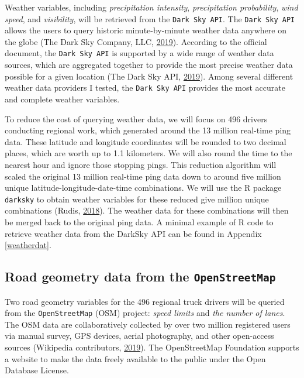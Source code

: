 \documentclass[12pt]{book}
\numberwithin{equation}{chapter}
\begin{document}
Weather variables, including \emph{precipitation intensity}, \emph{precipitation probability}, \emph{wind speed}, and \emph{visibility}, will be retrieved from the \texttt{Dark\ Sky\ API}.
The \texttt{Dark\ Sky\ API} allows the users to query historic minute-by-minute weather data anywhere on the globe (The Dark Sky Company, LLC, \protect\hyperlink{ref-darksky}{2019}).
According to the official document, the \texttt{Dark\ Sky\ API} is supported by a wide range of weather data sources, which are aggregated together to provide the most precise weather data possible for a given location (The Dark Sky API, \protect\hyperlink{ref-darkskyds}{2019}).
Among several different weather data providers I tested, the \texttt{Dark\ Sky\ API} provides the most accurate and complete weather variables.

To reduce the cost of querying weather data, we will focus on 496 drivers conducting regional work, which generated around the 13 million real-time ping data. These latitude and longitude coordinates will be rounded to two decimal places, which are worth up to 1.1 kilometers.
We will also round the time to the nearest hour and ignore those stopping pings.
This reduction algorithm will scaled the original 13 million real-time ping data down to around five million unique latitude-longitude-date-time combinations.
We will use the R package \texttt{darksky} to obtain weather variables for these reduced give million unique combinations (Rudis, \protect\hyperlink{ref-hrbrmstr}{2018}).
The weather data for these combinations will then be merged back to the original ping data.
A minimal example of R code to retrieve weather data from the DarkSky API can be found in Appendix \ref{weatherdat}.

\hypertarget{road-geometry-data-from-the-openstreetmap}{%
\subsection{\texorpdfstring{Road geometry data from the \texttt{OpenStreetMap}}{Road geometry data from the OpenStreetMap}}\label{road-geometry-data-from-the-openstreetmap}}

Two road geometry variables for the 496 regional truck drivers will be queried from the \texttt{OpenStreetMap} (OSM) project: \emph{speed limits} and \emph{the number of lanes}.
The OSM data are collaboratively collected by over two million registered users via manual survey, GPS devices, aerial photography, and other open-access sources (Wikipedia contributors, \protect\hyperlink{ref-wikiOSM}{2019}).
The OpenStreetMap Foundation supports a website to make the data freely available to the public under the Open Database License.
\end{document}
